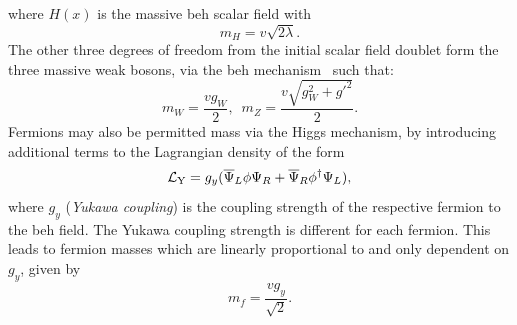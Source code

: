 where $H(x)$ is the massive \acrshort{beh} scalar field with
\begin{equation}
	m_{H} = v\sqrt{2\lambda}.
\end{equation}
The other three degrees of freedom from the initial scalar field doublet form the three massive weak bosons, via the \acrshort{beh} mechanism~\cite{Th:Higgs1, Th:Higgs2, Th:Higgs3} such that:
\begin{equation}
	m_{W} = \frac{vg_{W}}{2},
	\,\,\,
	m_{Z} = \frac{v\sqrt{g_{W}^{2}+g'^{2}}}{2}.
\end{equation}
Fermions may also be permitted mass via the Higgs mechanism, by introducing additional terms to the Lagrangian density of the form 
\begin{equation} \label{eq:LY}
	\mathcal{L}_{\mathrm{Y}} = g_{y}(\overline{\Psi}_L\phi\Psi_R+\overline{\Psi}_R\phi^{\dagger}\Psi_L), 
\end{equation}
where $g_{y}$ (\textit{Yukawa coupling}) is the coupling strength of the respective fermion to the \acrshort{beh} field.
The Yukawa coupling strength is different for each fermion.
This leads to fermion masses which are linearly proportional to and only dependent on $g_{y}$, given by
\begin{equation}
	m_{f}=\frac{vg_{y}}{\sqrt{2}}.
\end{equation}

